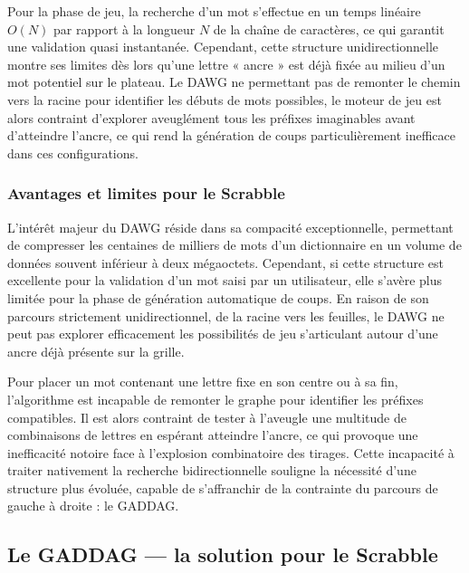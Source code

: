 \documentclass[a4paper]{article}
\begin{document}
Pour la phase de jeu, la recherche d'un mot s'effectue en un temps linéaire $O(N)$ par rapport à la longueur $N$ de la chaîne de caractères, ce qui garantit une validation quasi instantanée. 
Cependant, cette structure unidirectionnelle montre ses limites dès lors qu'une lettre « ancre » est déjà fixée au milieu d'un mot potentiel sur le plateau. 
Le DAWG ne permettant pas de remonter le chemin vers la racine pour identifier les débuts de mots possibles, le moteur de jeu est alors contraint d'explorer aveuglément tous les préfixes imaginables avant d'atteindre l'ancre, ce qui rend la génération de coups particulièrement inefficace dans ces configurations.\newline

\subsubsection{Avantages et limites pour le Scrabble}

L'intérêt majeur du DAWG réside dans sa compacité exceptionnelle, permettant de compresser les centaines de milliers de mots d'un dictionnaire en un volume de données souvent 
inférieur à deux mégaoctets. Cependant, si cette structure est excellente pour la validation d'un mot saisi par un utilisateur, elle s'avère plus limitée pour la phase de 
génération automatique de coups. En raison de son parcours strictement unidirectionnel, de la racine vers les feuilles, le DAWG ne peut pas explorer efficacement les 
possibilités de jeu s'articulant autour d'une ancre déjà présente sur la grille.\newline

\newpage
Pour placer un mot contenant une lettre fixe en son centre ou à sa fin, l'algorithme est incapable de remonter le graphe pour identifier les préfixes compatibles. Il est alors
 contraint de tester à l'aveugle une multitude de combinaisons de lettres en espérant atteindre l'ancre, ce qui provoque une inefficacité notoire face à l'explosion 
 combinatoire des tirages. Cette incapacité à traiter nativement la recherche bidirectionnelle souligne la nécessité d'une structure plus évoluée, capable de s'affranchir 
 de la contrainte du parcours de gauche à droite : le GADDAG.\newline

\subsection{Le GADDAG — la solution pour le Scrabble}
\end{document}
